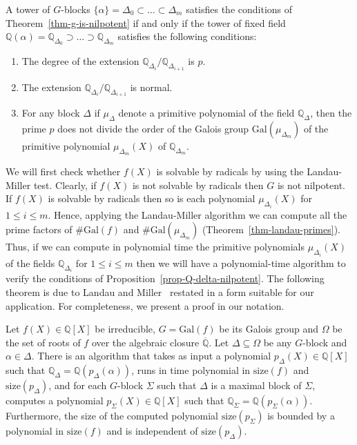 \documentclass[prodmod,acmtalg]{acmsmall}
\newcommand{\size}[1]{{\ensuremath{\mathrm{size}\left(#1\right)}}}
\newcommand{\Gal}[1]{{\ensuremath{\mathrm{Gal}\left(#1\right)}}}
\newcommand{\Q}{\ensuremath{\mathbb{Q}}}
\begin{document}
\begin{proposition}\label{prop-Q-delta-nilpotent}
  A tower of $G$-blocks $\{ \alpha \} = \Delta_0 \subset \ldots
  \subset \Delta_m$ satisfies the conditions of
  Theorem~\ref{thm-g-is-nilpotent} if and only if the tower of fixed
  field $\Q(\alpha) = \Q_{\Delta_0} \supset \ldots \supset
  \Q_{\Delta_m}$ satisfies the following conditions:
    \begin{enumerate}
    \item The degree of the extension
      $\Q_{\Delta_i}/\Q_{\Delta_{i+1}}$ is $p$.
    \item The extension $\Q_{\Delta_i}/\Q_{\Delta_{i+1}}$ is normal.
    \item For any block $\Delta$ if $\mu_{\Delta}$ denote a primitive
      polynomial of the field $\Q_\Delta$, then the prime $p$ does not
      divide the order of the Galois group $\Gal{\mu_{\Delta_m}}$ of
      the primitive polynomial $\mu_{\Delta_m}(X)$ of $\Q_{\Delta_m}$.
    \end{enumerate}
\end{proposition}

We will first check whether $f(X)$ is solvable by radicals by using
the Landau-Miller test. Clearly, if $f(X)$ is not solvable by radicals
then $G$ is not nilpotent. If $f(X)$ is solvable by radicals then so
is each polynomial $\mu_{\Delta_i}(X)$ for $1 \leq i \leq m$. Hence,
applying the Landau-Miller algorithm \cite{landau85solvability} we can
compute all the prime factors of $\#\Gal{f}$ and $\#
\Gal{\mu_{\Delta_m}}$ (Theorem~\ref{thm-landau-primes}). Thus, if we
can compute in polynomial time the primitive polynomials
$\mu_{\Delta_i}(X)$ of the fields $\Q_{\Delta_i}$ for $1 \leq i \leq
m$ then we will have a polynomial-time algorithm to verify the
conditions of Proposition~\ref{prop-Q-delta-nilpotent}. The following
theorem is due to Landau and Miller~\cite{landau85solvability}
restated in a form suitable for our application. For completeness, we
present a proof in our notation.

\begin{theorem}\label{thm-enlarge-block}
  Let $f(X)\in\Q[X]$ be irreducible, $G=\Gal{f}$ be its Galois group
  and $\Omega$ be the set of roots of $f$ over the algebraic closure
  $\overline{\Q}$. Let $\Delta\subseteq\Omega$ be any $G$-block and
  $\alpha\in \Delta$. There is an algorithm that takes as input a
  polynomial $p_\Delta(X) \in \Q[X]$ such that
  $\Q_\Delta=\Q(p_\Delta(\alpha))$, runs in time polynomial in
  $\size{f}$ and $\size{p_\Delta}$, and for each $G$-block $\Sigma$
  such that $\Delta$ is a maximal block of $\Sigma$, computes a
  polynomial $p_\Sigma(X) \in \Q[X]$ such that
  $\Q_\Sigma=\Q(p_\Sigma(\alpha))$. Furthermore, the size of the
  computed polynomial $\size{p_\Sigma}$ is bounded by a polynomial in
  $\size{f}$ and is independent of $\size{p_\Delta}$.
\end{theorem}
\end{document}
